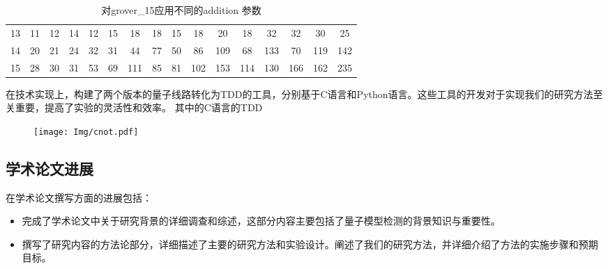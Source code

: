 \begin{table}[!htbp]
\begin{tabular}{c|ccccccccccccccc}
    \rowcolor[HTML]{8DB4E2} 
    \cellcolor[HTML]{FFFFFF}13 & 11                                               & 12                          & 14                          & 12                          & 15                          & 18                                               & 18                         & 15                          & 18                          & 20                          & 18                          & 32                          & 32                          & 30                          & 25                          \\
    \rowcolor[HTML]{8DB4E2} 
    \cellcolor[HTML]{FFFFFF}14 & 20                                               & 21                          & 24                          & 32                          & 31                          & 44                                               & 77                         & 50                          & 86                          & \cellcolor[HTML]{538DD5}109 & 68                          & \cellcolor[HTML]{538DD5}133 & 70                          & \cellcolor[HTML]{538DD5}119 & \cellcolor[HTML]{538DD5}142 \\
    \rowcolor[HTML]{538DD5} 
    \cellcolor[HTML]{FFFFFF}15 & \cellcolor[HTML]{8DB4E2}28                       & \cellcolor[HTML]{8DB4E2}30  & \cellcolor[HTML]{8DB4E2}31  & \cellcolor[HTML]{8DB4E2}53  & \cellcolor[HTML]{8DB4E2}69  & 111                                              & \cellcolor[HTML]{8DB4E2}85 & \cellcolor[HTML]{8DB4E2}81  & 102                         & 153                         & 114                         & 130                         & 166                         & 162                         & 235                        
                     
    \end{tabular}
    \caption{对grover\_15应用不同的addition 参数}%
    \label{table:addition}
\end{table}
  
在技术实现上，构建了两个版本的量子线路转化为TDD的工具，分别基于C语言和Python语言。这些工具的开发对于实现我们的研究方法至关重要，提高了实验的灵活性和效率。
其中的C语言的TDD
\begin{figure}[!htbp]
    \centering
    \texttt{[image: Img/cnot.pdf]}
\end{figure}

\subsection{学术论文进展}
在学术论文撰写方面的进展包括：
\begin{itemize}
    \item 完成了学术论文中关于研究背景的详细调查和综述，这部分内容主要包括了量子模型检测的背景知识与重要性。
    \item 撰写了研究内容的方法论部分，详细描述了主要的研究方法和实验设计。阐述了我们的研究方法，并详细介绍了方法的实施步骤和预期目标。
\end{itemize}
